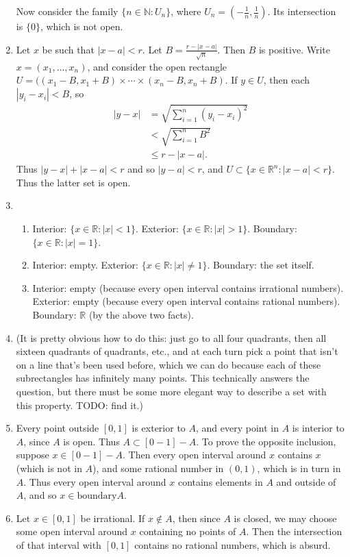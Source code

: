 \documentclass{article}
\begin{document}
\begin{enumerate}[label=\textbf{1-\arabic*.}]
Now consider the family $\{n\in\mathbb N: U_n\}$, where $U_n = (-\frac{1}{n},\frac{1}{n})$. Its intersection is $\{0\}$, which is not open.
\item Let $x$ be such that $|x-a|<r$. Let $B=\frac{r-|x-a|}{\sqrt{n}}$. Then $B$ is positive. Write $x=(x_1, \ldots, x_n)$, and consider the open rectangle $U=((x_1-B,x_1+B)\times\cdots\times (x_n-B,x_n+B)$. If $y\in U$, then each $|y_i - x_i| < B$, so 
\begin{align*}
|y-x| &= \sqrt{\sum_{i=1}^n (y_i - x_i) ^2}\\
	& < \sqrt{\sum_{i=1}^n B^2}\\
	& \leq r - |x-a|.
\end{align*}
Thus $|y-x| + |x-a| < r$ and so $|y-a| < r$, and $U\subset \{x\in\mathbb R^n:|x-a|<r\}$. Thus the latter set is open.
\item
\begin{enumerate}
\item Interior: $\{x\in\mathbb R: |x|<1\}$. Exterior: $\{x\in\mathbb R: |x|>1\}$. Boundary: $\{x\in\mathbb R: |x|=1\}$.
\item Interior: empty. Exterior: $\{x\in\mathbb R: |x|\neq 1\}$. Boundary: the set itself.
\item Interior: empty (because every open interval contains irrational numbers). Exterior: empty (because every open interval contains rational numbers). Boundary: $\mathbb R$ (by the above two facts).
\end{enumerate}
\item (It is pretty obvious how to do this: just go to all four quadrants, then all sixteen quadrants of quadrants, etc., and at each turn pick a point that isn't on a line that's been used before, which we can do because each of these subrectangles has infinitely many points. This technically answers the question, but there must be some more elegant way to describe a set with this property. TODO: find it.)
\item Every point outside $[0,1]$ is exterior to $A$, and every point in $A$ is interior to $A$, since $A$ is open. Thus $A\subset [0-1]-A$. To prove the opposite inclusion, suppose $x\in [0-1]-A$. Then every open interval around $x$ contains $x$ (which is not in $A$), and some rational number in $(0,1)$, which is in turn in $A$. Thus every open interval around $x$ contains elements in $A$ and outside of $A$, and so $x\in\textrm{boundary}A$.
\item Let $x\in[0,1]$ be irrational. If $x\notin A$, then since $A$ is closed, we may choose some open interval around $x$ containing no points of $A$. Then the intersection of that interval with $[0,1]$ contains no rational numbers, which is absurd.

\end{enumerate}
\end{document}
